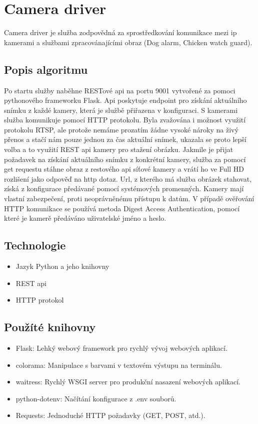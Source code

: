 \section{Camera driver}\label{sec:camera-driver}
Camera driver je služba zodpovědná za sprostředkování komunikace mezi ip kamerami a službami zpracovánajícími obraz (Dog alarm, Chicken watch guard).\newline

\subsection*{Popis algoritmu}
Po startu služby naběhne RESTové api na portu 9001 vytvořené za pomoci pythonového frameworku Flask.
Api poskytuje endpoint pro získání aktuálního snímku z každé kamery, která je službě přiřazena v konfiguraci.
S kamerami služba komunikuje pomocí HTTP protokolu.
Byla zvažována i možnost využití protokolu RTSP, ale protože nemáme prozatím žádne vysoké nároky na živý přenos a stačí nám pouze jednou za čas aktuální snímek, ukazala se proto lepší volba a to využití REST api kamery pro stažení obrázku.
Jakmile je přijat požadavek na získání aktuálního snímku z konkrétní kamery, služba za pomocí get requestu stáhne obraz z restového api síťové kamery a vrátí ho ve Full HD rozlišení jako odpověď na http dotaz.
Url, z kterého má služba obrázek stahovat, získá z konfigurace předávané pomocí systémových promenných.
Kamery mají vlastní zabezpečení, proti neoprávněnému přístupu k datům.
V případě ověřování HTTP komunikace se používá metoda Digest Access Authentication, pomocí které je kamerě předáváno uživatelské jméno a heslo.

\subsection*{Technologie}
\begin{itemize}
    \item Jazyk Python a jeho knihovny
    \item REST api
    \item HTTP protokol
\end{itemize}

\subsection*{Použíté knihovny}
\begin{itemize}
    \item Flask: Lehký webový framework pro rychlý vývoj webových aplikací.
    \item colorama: Manipulace s barvami v textovém výstupu na terminálu.
    \item waitress: Rychlý WSGI server pro produkční nasazení webových aplikací.
    \item python-dotenv: Načítání konfigurace z .env souborů.
    \item Requests: Jednoduché HTTP požadavky (GET, POST, atd.).
\end{itemize}

